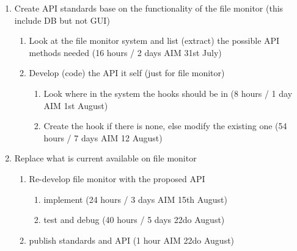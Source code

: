 \documentclass{article}
\begin{document}
\begin{enumerate}
    \item Create API standards base on the functionality of the file monitor (this include DB but not GUI)
        \begin{enumerate}

        \item Look at the file monitor system and list (extract) the possible API methods needed (16 hours / 2 days AIM 31st July)

        \item Develop (code) the API it self (just for file monitor) 

                \begin{enumerate}

                \item Look where in the system the hooks should be in (8 hours / 1 day AIM 1st August)

                \item Create the hook if there is none, else modify the existing one (54 hours / 7 days AIM 12 August)

                \end{enumerate}

        \end{enumerate}


    \item Replace what is current available on file monitor 
        \begin{enumerate}

        \item Re-develop file monitor with the proposed API %
                \begin{enumerate}

                \item implement (24 hours / 3 days AIM 15th August)

                \item test and debug (40 hours / 5 days 22do August)

                \end{enumerate}

        \item publish standards and API (1 hour AIM 22do August)
        \end{enumerate}
\end{enumerate}


% 
% 
\end{document}
